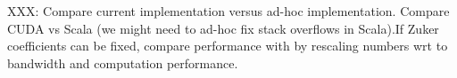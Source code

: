 {\color{red} XXX: Compare current implementation versus ad-hoc implementation. Compare CUDA vs Scala (we might need to ad-hoc fix stack overflows in Scala).If Zuker coefficients can be fixed, compare performance with \cite{adp_gpu} by rescaling numbers wrt to bandwidth and computation performance.}

